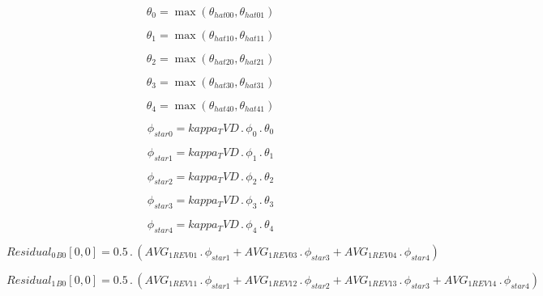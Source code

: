\documentclass{article}
\begin{document}
\begin{dmath}\theta_{0} = \max\left(\theta_{hat 00}, \theta_{hat 01}\right)\end{dmath}

\begin{dmath}\theta_{1} = \max\left(\theta_{hat 10}, \theta_{hat 11}\right)\end{dmath}

\begin{dmath}\theta_{2} = \max\left(\theta_{hat 20}, \theta_{hat 21}\right)\end{dmath}

\begin{dmath}\theta_{3} = \max\left(\theta_{hat 30}, \theta_{hat 31}\right)\end{dmath}

\begin{dmath}\theta_{4} = \max\left(\theta_{hat 40}, \theta_{hat 41}\right)\end{dmath}

\begin{dmath}\phi_{star 0} = kappa_TVD \,.\, \phi_{0} \,.\, \theta_{0}\end{dmath}

\begin{dmath}\phi_{star 1} = kappa_TVD \,.\, \phi_{1} \,.\, \theta_{1}\end{dmath}

\begin{dmath}\phi_{star 2} = kappa_TVD \,.\, \phi_{2} \,.\, \theta_{2}\end{dmath}

\begin{dmath}\phi_{star 3} = kappa_TVD \,.\, \phi_{3} \,.\, \theta_{3}\end{dmath}

\begin{dmath}\phi_{star 4} = kappa_TVD \,.\, \phi_{4} \,.\, \theta_{4}\end{dmath}

\begin{dmath}{Residual_{0}{_{B0}}}[{0,0}] = 0.5 \,.\, \left(AVG_{1 REV 01} \,.\, \phi_{star 1} + AVG_{1 REV 03} \,.\, \phi_{star 3} + AVG_{1 REV 04} \,.\, \phi_{star 4}\right)\end{dmath}

\begin{dmath}{Residual_{1}{_{B0}}}[{0,0}] = 0.5 \,.\, \left(AVG_{1 REV 11} \,.\, \phi_{star 1} + AVG_{1 REV 12} \,.\, \phi_{star 2} + AVG_{1 REV 13} \,.\, \phi_{star 3} + AVG_{1 REV 14} \,.\, \phi_{star 4}\right)\end{dmath}
\end{document}
